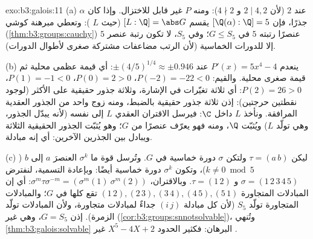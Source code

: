 \begin{solution}{exo:b3:galois:11}
(a)  عند $2$ (لأن $2 \mid 4, 2$ و $4 \nmid 2$): ومنه
$P$ غير قابل للاختزال. وإذا كان $\alpha$ جذرًا، فإن $[\Q(\alpha):\Q] = 5$ يقسم
$[L:\Q] = \abs G$ (حيث $L$ ): وتعطي مبرهنة كوشي (\cref{thm:b3:groups:cauchy})
عنصرًا رتبته $5$ في $G \leq S_5$؛ وفي $S_5$، لا تكون رتبة عنصر
$5$ إلا للدورات الخماسية (لأن الرتب مضاعفات مشتركة صغرى لأطوال
الدورات).

(b) ينعدم $P'(x) = 5x^4 - 4$ عند $\pm(4/5)^{1/4} \approx \pm
0.946$: أي قيمة عظمى محلية ثم قيمة صغرى
محلية. والقيم: $P(-2)
= -22 < 0$، $P(0) = 2 > 0$، $P(1) = -1 < 0$،
$P(2) = 26 > 0$: أي ثلاثة تغيّرات في الإشارة، وثلاثة جذور
حقيقية على الأكثر (لوجود نقطتين حرجتين): إذن ثلاثة جذور حقيقية
بالضبط، ومنه زوج واحد من الجذور العقدية المرافقة. ونأخذ  $L$ داخل $\C$: فيرسل الاقتران العقدي $L$ إلى نفسه (لأنه
يبدّل الجذور، وهي تولّد $L$) ويُثبّت $\Q$، ومنه فهو يعرّف عنصرًا
من $G$؛ وهو يُثبّت الجذور الحقيقية الثلاثة ويبادل بين الجذرين
الآخرين: أي إنه مبادلة.

(c) ليكن $\tau = (a\,b)$ ولتكن $\sigma$ دورة خماسية في $G$.
وتُرسل قوة ما $\sigma^k$ العنصرَ $a$ إلى $b$ ($k \ne 0 \bmod 5$)، وتكون
$\sigma^k$ دورة خماسية أيضًا: وبإعادة التسمية، لنفترض $\sigma =
(1\,2\,3\,4\,5)$
و $\tau = (1\,2)$. وبالاقتران، $\sigma^m\tau\sigma^{-m} = (\sigma^m(1)\ \sigma^m(2))$: أي إن المبادلات
المتجاورة $(1\,2), (2\,3), (3\,4), (4\,5),
(5\,1)$ تقع كلها في $G$؛ والمبادلات المتجاورة تولّد
$S_5$ (لأن كل مبادلة $(i\,j)$ جداءٌ لمبادلات متجاورة، ولأن
المبادلات تولّد الزمرة). إذن $G = S_5$، وهي غير 
(\cref{cor:b3:groups:snnotsolvable})، وتُنهي \cref{thm:b3:galois:solvable} البرهان: فكثير الحدود
$X^5 - 4X + 2$ غير .
\end{solution}

